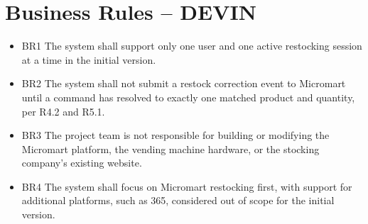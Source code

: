 \documentclass{scrreprt}
\begin{document}
\section{Business Rules -- DEVIN}
\begin{itemize}
    \item BR1 The system shall support only one user and one active restocking session at a time in the initial version.
    \item BR2 The system shall not submit a restock correction event to Micromart until a command has resolved to exactly one matched product and quantity, per R4.2 and R5.1.
    \item BR3 The project team is not responsible for building or modifying the Micromart platform, the vending machine hardware, or the stocking company's existing website.
    \item BR4 The system shall focus on Micromart restocking first, with support for additional platforms, such as 365, considered out of scope for the initial version.
\end{itemize}
\end{document}
